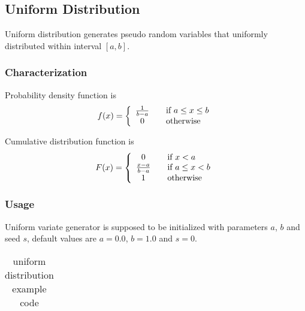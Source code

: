\subsection{Uniform Distribution} \label{uniformdistribution}

Uniform distribution generates pseudo random variables that uniformly distributed within interval $[a,b]$.

\subsubsection{Characterization}

Probability density function is
\begin{equation}
 f(x) = \left\{
  \begin{array}{c l}
      \frac{1}{b-a} & \quad \text{if $a \leq x \leq b$}\\
    0 & \quad \text{otherwise}
  \end{array} \right.
\end{equation}

Cumulative distribution function is
\begin{equation}
 F(x) = \left\{
  \begin{array}{c l}
      0               & \quad \text{if $x < a$} \\
      \frac{x-a}{b-a} & \quad \text{if $a \leq x < b$}\\
      1               & \quad \text{otherwise}
  \end{array} \right.
\end{equation}


\subsubsection{Usage}

Uniform variate generator is supposed to be initialized with parameters $a$, $b$ and seed $s$, default values are $a = 0.0$, $b = 1.0$ and $s = 0$.

\begin{small}
\begin{ttfamily}
\begin{center}
\begin{longtable}{|l|}
\caption{uniform distribution example code} \\
\hline 

\hline
\end{longtable}
\end{center}
\end{ttfamily}
\end{small}


